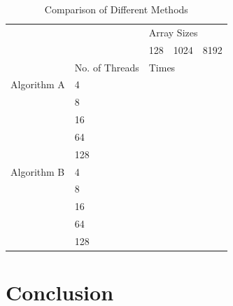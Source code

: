 \documentclass[journal, a4paper]{IEEEtran}
\begin{document}
\begin{table}[H]
\centering
\caption{Comparison of Different Methods}
\label{my-label}
\begin{tabular}{|l|l|l|l|l|}
\hline
\multicolumn{2}{|l|}{\multirow{2}{*}{}} & \multicolumn{3}{l|}{Array Sizes} \\ \cline{3-5}
\multicolumn{2}{|l|}{}                  & 128      & 1024      & 8192      \\ \hline
                     & No. of Threads   & \multicolumn{3}{l|}{Times}       \\ \hline
Algorithm A              & 4                &          &           &           \\ \hline
\multirow{4}{*}{}    & 8                &          &           &           \\ \cline{2-5}
                     & 16               &          &           &           \\ \cline{2-5}
                     & 64               &          &           &           \\ \cline{2-5}
                     & 128              &          &           &           \\ \hline
Algorithm B               & 4                &          &           &           \\ \hline
\multirow{4}{*}{}    & 8                &          &           &           \\ \cline{2-5}
                     & 16               &          &           &           \\ \cline{2-5}
                     & 64               &          &           &           \\ \cline{2-5}
                     & 128              &          &           &           \\ \hline
\end{tabular}
\end{table}

\section{Conclusion}
\end{document}
